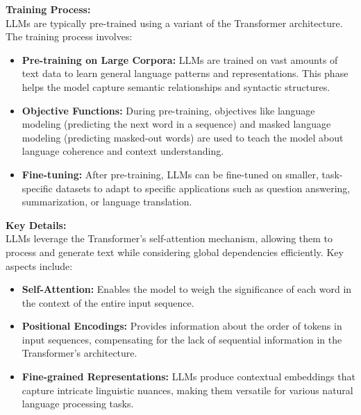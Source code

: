 \hfill \break
\textbf{Training Process:} \\

LLMs are typically pre-trained using a variant of the Transformer architecture. The training process involves:

\begin{itemize}
    \item \textbf{Pre-training on Large Corpora:} LLMs are trained on vast amounts of text data to learn general language patterns and representations. This phase helps the model capture semantic relationships and syntactic structures.
    
    \item \textbf{Objective Functions:} During pre-training, objectives like language modeling (predicting the next word in a sequence) and masked language modeling (predicting masked-out words) are used to teach the model about language coherence and context understanding.
    
    \item \textbf{Fine-tuning:} After pre-training, LLMs can be fine-tuned on smaller, task-specific datasets to adapt to specific applications such as question answering, summarization, or language translation.
\end{itemize}

\hfill \break
\textbf{Key Details:} \\

LLMs leverage the Transformer's self-attention mechanism, allowing them to process and generate text while considering global dependencies efficiently. Key aspects include:

\begin{itemize}
    \item \textbf{Self-Attention:} Enables the model to weigh the significance of each word in the context of the entire input sequence.
    
    \item \textbf{Positional Encodings:} Provides information about the order of tokens in input sequences, compensating for the lack of sequential information in the Transformer's architecture.
    
    \item \textbf{Fine-grained Representations:} LLMs produce contextual embeddings that capture intricate linguistic nuances, making them versatile for various natural language processing tasks.
\end{itemize}

